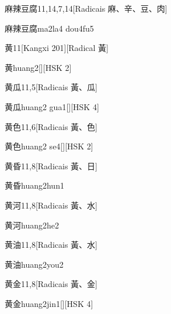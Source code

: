 \begin{entry}{麻辣豆腐}{11,14,7,14}[Radicais ⿇、⾟、⾖、⾁]
  \begin{phonetics}{麻辣豆腐}{ma2la4 dou4fu5}
  \end{phonetics}
\end{entry}

\begin{entry}{黄}{11}[Kangxi 201][Radical ⿈]
  \begin{phonetics}{黄}{huang2}[][HSK 2]
  \end{phonetics}
\end{entry}

\begin{entry}{黄瓜}{11,5}[Radicais ⿈、⽠]
  \begin{phonetics}{黄瓜}{huang2 gua1}[][HSK 4]
  \end{phonetics}
\end{entry}

\begin{entry}{黄色}{11,6}[Radicais ⿈、⾊]
  \begin{phonetics}{黄色}{huang2 se4}[][HSK 2]
  \end{phonetics}
\end{entry}

\begin{entry}{黄昏}{11,8}[Radicais ⿈、⽇]
  \begin{phonetics}{黄昏}{huang2hun1}
  \end{phonetics}
\end{entry}

\begin{entry}{黄河}{11,8}[Radicais ⿈、⽔]
  \begin{phonetics}{黄河}{huang2he2}
  \end{phonetics}
\end{entry}

\begin{entry}{黄油}{11,8}[Radicais ⿈、⽔]
  \begin{phonetics}{黄油}{huang2you2}
  \end{phonetics}
\end{entry}

\begin{entry}{黄金}{11,8}[Radicais ⿈、⾦]
  \begin{phonetics}{黄金}{huang2jin1}[][HSK 4]
  \end{phonetics}
\end{entry}


